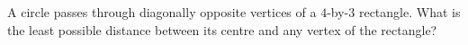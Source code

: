 A circle passes through diagonally opposite vertices of a $4$-by-$3$ rectangle. What is the least possible distance between its centre and any vertex of the rectangle?
